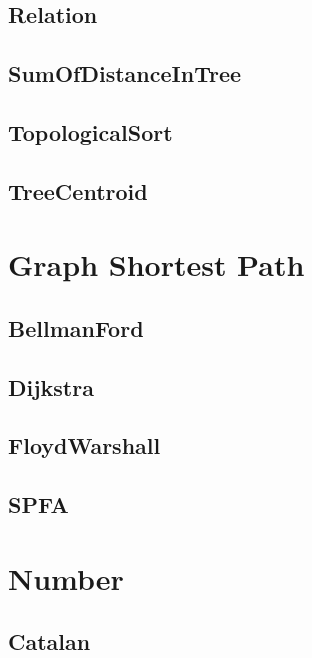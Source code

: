 \subsection{Relation}

\subsection{SumOfDistanceInTree}

\subsection{TopologicalSort}

\subsection{TreeCentroid}


\section{Graph Shortest Path}

\subsection{BellmanFord}

\subsection{Dijkstra}

\subsection{FloydWarshall}

\subsection{SPFA}


\section{Number}

\subsection{Catalan}

